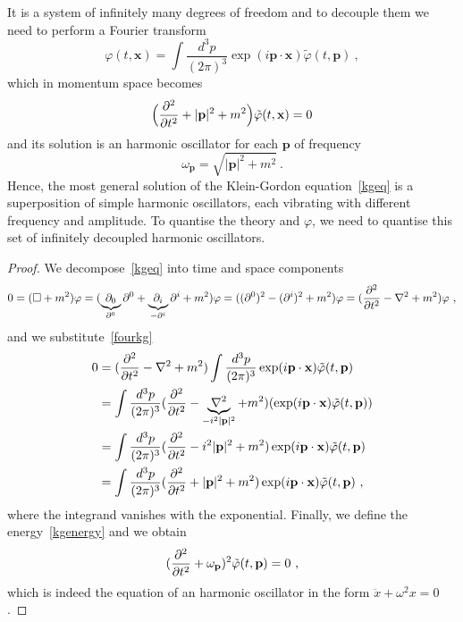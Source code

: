     It is a system of infinitely many degrees of freedom and to decouple them we need to perform a Fourier transform 
    \begin{equation}\label{fourkg}
        \varphi (t, \mathbf x) = \int \frac{d^3 p}{(2\pi)^3} \exp(i \mathbf p \cdot \mathbf x) \tilde \varphi(t, \mathbf p) ~,
    \end{equation}
    which in momentum space becomes 
    \begin{equation*}
        \Big ( \frac{\partial^2 }{\partial t^2} + |\mathbf p|^2 + m^2 \Big) \tilde \varphi(t, \mathbf x) = 0
    \end{equation*}
    and its solution is an harmonic oscillator for each $\mathbf p$ of frequency 
    \begin{equation}\label{kgenergy}
        \omega_{\mathbf p} = \sqrt{|\mathbf p|^2 + m^2}~.
    \end{equation}
    Hence, the most general solution of the Klein-Gordon equation~\eqref{kgeq} is a superposition of simple harmonic oscillators, each vibrating with different frequency and amplitude. To quantise the theory and $\varphi$, we need to quantise this set of infinitely decoupled harmonic oscillators.
    \begin{proof}
        We decompose~\eqref{kgeq} into time and space components
        \begin{equation*}
            0 = (\Box + m^2) \varphi = (\underbrace{\partial_0}_{\partial^0} \partial^0 + \underbrace{\partial_i}_{-\partial^i} \partial^i + m^2) \varphi = ((\partial^0)^2 - (\partial^i)^2 + m^2) \varphi = (\frac{\partial^2 }{\partial t^2} - \nabla^2 + m^2) \varphi ~,
        \end{equation*}
        and we substitute~\eqref{fourkg}
        \begin{equation*}
        \begin{aligned}
            0 & = (\frac{\partial^2 }{\partial t^2} - \nabla^2 + m^2) \int \frac{d^3 p}{(2\pi)^3} \exp(i \mathbf p \cdot \mathbf x) \tilde \varphi(t, \mathbf p) \\ & = \int \frac{d^3 p}{(2\pi)^3} (\frac{\partial^2 }{\partial t^2} - \underbrace{\nabla^2}_{- i^2 |\mathbf p|^2} + m^2) (\exp(i \mathbf p \cdot \mathbf x) \tilde \varphi(t, \mathbf p)) \\ & = \int \frac{d^3 p}{(2\pi)^3} (\frac{\partial^2 }{\partial t^2} - i^2 |\mathbf p|^2 + m^2) \exp(i \mathbf p \cdot \mathbf x) \tilde \varphi(t, \mathbf p) \\ & = \int \frac{d^3 p}{(2\pi)^3} (\frac{\partial^2 }{\partial t^2} + |\mathbf p|^2 + m^2) \exp(i \mathbf p \cdot \mathbf x) \tilde \varphi(t, \mathbf p) ~,
        \end{aligned}
        \end{equation*}
        where the integrand vanishes with the exponential. Finally, we define the energy~\eqref{kgenergy} and we obtain 
        \begin{equation*}
            (\frac{\partial^2 }{\partial t^2} + \omega_{\mathbf p})^2 \tilde \varphi(t, \mathbf p) = 0 ~,
        \end{equation*} 
        which is indeed the equation of an harmonic oscillator in the form $\ddot x + \omega^2 x = 0$.
    \end{proof}

